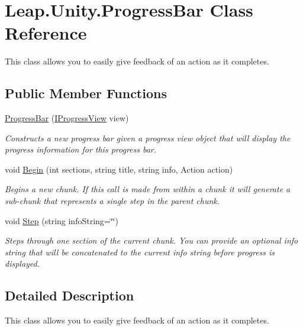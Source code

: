 \hypertarget{class_leap_1_1_unity_1_1_progress_bar}{}\section{Leap.\+Unity.\+Progress\+Bar Class Reference}
\label{class_leap_1_1_unity_1_1_progress_bar}


This class allows you to easily give feedback of an action as it completes.  


\subsection*{Public Member Functions}
\begin{DoxyCompactItemize}
\item 
\mbox{\hyperlink{class_leap_1_1_unity_1_1_progress_bar_a3eae09f6ae1b8ac7ef13c2e5fbb18687}{Progress\+Bar}} (\mbox{\hyperlink{interface_leap_1_1_unity_1_1_i_progress_view}{I\+Progress\+View}} view)
\begin{DoxyCompactList}\small\item\em Constructs a new progress bar given a progress view object that will display the progress information for this progress bar. \end{DoxyCompactList}\item 
void \mbox{\hyperlink{class_leap_1_1_unity_1_1_progress_bar_a82ed530190bcad8fe2d51f1555c50743}{Begin}} (int sections, string title, string info, Action action)
\begin{DoxyCompactList}\small\item\em Begins a new chunk. If this call is made from within a chunk it will generate a sub-\/chunk that represents a single step in the parent chunk. \end{DoxyCompactList}\item 
void \mbox{\hyperlink{class_leap_1_1_unity_1_1_progress_bar_aa59a69d7baf972994660394378c9e3a9}{Step}} (string info\+String=\char`\"{}\char`\"{})
\begin{DoxyCompactList}\small\item\em Steps through one section of the current chunk. You can provide an optional info string that will be concatenated to the current info string before progress is displayed. \end{DoxyCompactList}\end{DoxyCompactItemize}


\subsection{Detailed Description}
This class allows you to easily give feedback of an action as it completes. 

